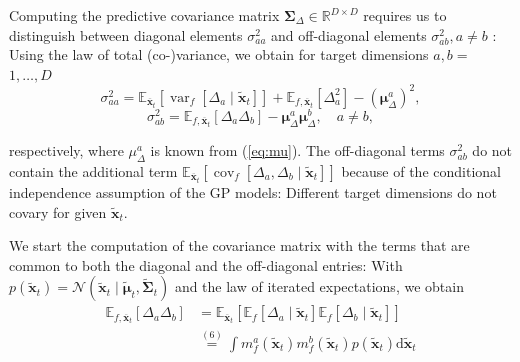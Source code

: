 Computing the predictive covariance matrix $\mathbf{\Sigma}_{\Delta} \in \mathbb{R}^{D \times D}$ requires us to distinguish between diagonal elements $\sigma_{a a}^2$ and off-diagonal elements $\sigma_{a b}^2, a \neq b$ : Using the law of total (co-)variance, we obtain for target dimensions $a, b=$ $1, \ldots, D$
\begin{equation}\label{eq:sigma_aa}
\sigma_{a a}^2  =\mathbb{E}_{\overline{\boldsymbol{x}}_t}\left[\operatorname{var}_f\left[\Delta_a \mid \tilde{\boldsymbol{x}}_t\right]\right]+\mathbb{E}_{f, \overline{\boldsymbol{x}}_t}\left[\Delta_a^2\right]-\left(\boldsymbol{\mu}_{\Delta}^a\right)^2,
\end{equation}
\begin{equation}\label{eq:sigma_ab}
    \sigma_{a b}^2 =\mathbb{E}_{f, \overline{\boldsymbol{x}}_t}\left[\Delta_a \Delta_b\right]-\boldsymbol{\mu}_{\Delta}^a \boldsymbol{\mu}_{\Delta}^b, \quad a \neq b,
\end{equation}

respectively, where $\mu_{\Delta}^a$ is known from (\ref{eq:mu}). The off-diagonal terms $\sigma_{a b}^2$ do not contain the additional term $\mathbb{E}_{\overline{\boldsymbol{x}}_t}\left[\operatorname{cov}_f\left[\Delta_a, \Delta_b \mid \tilde{\boldsymbol{x}}_t\right]\right]$ because of the conditional independence assumption of the GP models: Different target dimensions do not covary for given $\tilde{\boldsymbol{x}}_t$.

We start the computation of the covariance matrix with the terms that are common to both the diagonal and the off-diagonal entries: With $p\left(\tilde{\boldsymbol{x}}_t\right)=\mathcal{N}\left(\tilde{\boldsymbol{x}}_t \mid \tilde{\boldsymbol{\mu}}_t, \tilde{\boldsymbol{\Sigma}}_t\right)$ and the law of iterated expectations, we obtain
\begin{equation}\label{eq:Eab}
\begin{aligned}
\mathbb{E}_{f, \overline{\boldsymbol{x}}_t}\left[\Delta_a \Delta_b\right] & =\mathbb{E}_{\overline{\boldsymbol{x}}_t}\left[\mathbb{E}_f\left[\Delta_a \mid \tilde{\boldsymbol{x}}_t\right] \mathbb{E}_f\left[\Delta_b \mid \tilde{\boldsymbol{x}}_t\right]\right] \\
& \stackrel{(6)}{=} \int m_f^a\left(\tilde{\boldsymbol{x}}_t\right) m_f^b\left(\tilde{\boldsymbol{x}}_t\right) p\left(\tilde{\boldsymbol{x}}_t\right) \mathrm{d} \tilde{\boldsymbol{x}}_t
\end{aligned}
\end{equation}

